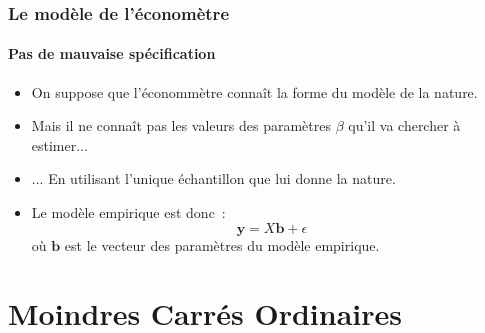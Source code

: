 \documentclass[10pt]{beamer}
\theoremstyle{plain}
\begin{document}
\begin{frame}
  \frametitle{Le modèle de l'économètre}
  \framesubtitle{Pas de mauvaise spécification}

  \begin{itemize}

  \item On suppose que l'économmètre connaît la forme du modèle de la nature.\newline

    \bigskip

  \item Mais il ne connaît pas les valeurs des paramètres $\beta$ qu'il va chercher à estimer...\newline

    \bigskip

  \item ... En utilisant l'unique échantillon que lui donne la nature.\newline

    \bigskip

  \item Le modèle empirique est donc~:
    \[
      \mathbf y = X\mathbf b + \epsilon
    \]
    où $\mathbf b$ est le vecteur des paramètres du modèle empirique.
  \end{itemize}

\end{frame}

\section{Moindres Carrés Ordinaires}
\end{document}
